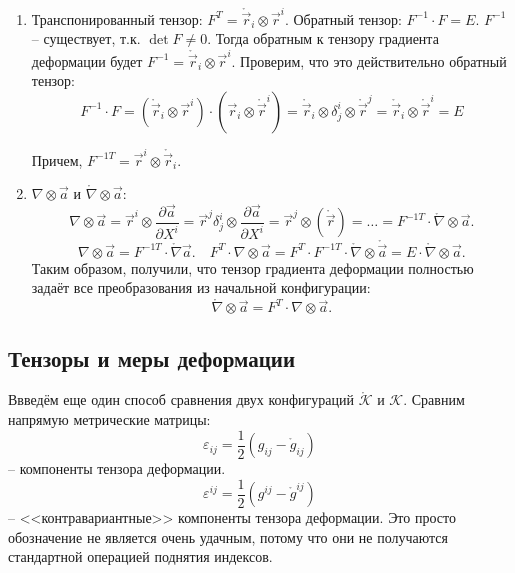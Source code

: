 \begin{enumerate}
  \item Транспонированный тензор: $F^T = \mathring{\vec{r}}_i \otimes \vec{r}^i$.
    Обратный тензор: $F^{-1} \cdot F = E$.
    $F^{-1}$ -- существует, т.к. $\det F \neq 0$.
    Тогда обратным к тензору градиента деформации будет $F^{-1} = \mathring{\vec{r}}_i \otimes \vec{r}^i$.
    Проверим, что это действительно обратный тензор:
    \[
      F^{-1} \cdot F
      = (\mathring{\vec{r}}_i \otimes \vec{r}^i) \cdot (\vec{r}_i \otimes \mathring{\vec{r}}^i)
      = \mathring{\vec{r}}_i \otimes \delta^i_j \otimes \mathring{\vec{r}}^j
      = \mathring{\vec{r}}_i \otimes \mathring{\vec{r}}^i = E
    \]

    Причем, $F^{-1 T} = \vec{r}^i \otimes \mathring{\vec{r}}_i$.

  \item $\nabla \otimes \vec{a}$ и $\mathring{\nabla} \otimes \vec{a}$:
    \[
      \nabla \otimes \vec{a} = \vec{r}^i \otimes \dfrac{\partial \vec{a}}{\partial X^i}
      = \vec{r}^j \delta^i_j \otimes \dfrac{\partial \vec{a}}{\partial X^i} 
      = \vec{r}^j \otimes (\mathring{\vec{r}} )
      = \dots
      = F^{-1 T} \cdot \mathring{\nabla} \otimes \vec{a}.
    \]
    \[
      \nabla \otimes \vec{a} = F^{-1 T} \cdot \mathring{\nabla} \vec{a}.
      \quad
      F^T \cdot \nabla \otimes \vec{a} = F^T \cdot F^{-1 T} \cdot \mathring{\nabla} \otimes \mathring{\vec{a}} = E \cdot \mathring{\nabla} \otimes \vec{a}.
    \]
    Таким образом, получили, что тензор градиента деформации полностью задаёт все преобразования 
    из начальной конфигурации:
    \[
      \mathring{\nabla} \otimes \vec{a} = F^T \cdot \nabla \otimes \vec{a}.
    \]
\end{enumerate}

\subsection{Тензоры и меры деформации}


Ввведём еще один способ сравнения двух конфигураций $\mathring{\mathcal{K}}$ и $\mathcal{K}$.
Сравним напрямую метрические матрицы:
\[
  \varepsilon_{ij} = \dfrac{1}{2} \left( g_{ij} - \mathring{g}_{ij} \right) 
\]
-- компоненты тензора деформации.
\[
  \varepsilon^{ij} = \dfrac{1}{2} (g^{ij} - \mathring{g}^{ij})
\]
--  <<контравариантные>> компоненты тензора деформации. Это просто обозначение не является очень
удачным, потому что они не получаются стандартной операцией поднятия индексов.

